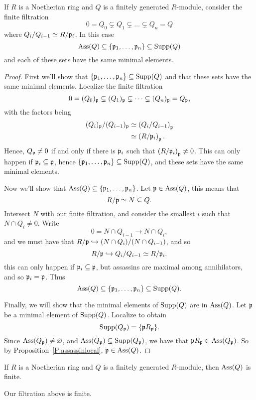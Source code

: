 \documentclass{ximera}
\begin{document}
\begin{theorem}
  If $R$ is a Noetherian ring and $Q$ is a finitely generated
  $R$-module, consider the finite filtration
  \[
  0 = Q_0 \subsetneq Q_1 \subsetneq \dots \subsetneq Q_n = Q 
  \]
  where $Q_i/Q_{i-1} \simeq R/\mathfrak{p}_i$. In this case
  \[
  \operatorname{Ass}(Q) \subseteq \{\mathfrak{p}_1,\dots,\mathfrak{p}_n\}\subseteq \operatorname{Supp}(Q)
  \]
  and each of these sets have the same minimal elements.
  \begin{proof}
    First we'll show that $\{\mathfrak{p}_1,\dots,\mathfrak{p}_n\}\subseteq \operatorname{Supp}(Q)$ and
    that these sets have the same minimal elements. Localize the
    finite filtration
    \[
    0 = (Q_0)_{\mathfrak{p}} \subsetneq (Q_1)_{\mathfrak{p}} \subsetneq \dots \subsetneq (Q_n)_{\mathfrak{p}} = Q_{\mathfrak{p}},
    \]
    with the factors being
    \begin{align*}
      (Q_i)_{\mathfrak{p}}/(Q_{i-1})_{\mathfrak{p}} &\simeq \left(Q_i/Q_{i-1}\right)_{\mathfrak{p}}\\
      &\simeq \left(R/\mathfrak{p}_i\right)_{\mathfrak{p}}.
    \end{align*}
    Hence, $Q_{\mathfrak{p}} \ne 0$ if and only if there is $\mathfrak{p}_i$ such that
    $\left(R/\mathfrak{p}_i\right)_{\mathfrak{p}} \ne 0$. This can only happen if
    $\mathfrak{p}_i\subseteq\mathfrak{p}$, hence $\{\mathfrak{p}_1,\dots,\mathfrak{p}_n\}\subseteq \operatorname{Supp}(Q)$, and
    these sets have the same minimal elements.

    Now we'll show that $\operatorname{Ass}(Q)\subseteq\{\mathfrak{p}_1,\dots,\mathfrak{p}_n\}$. Let
    $\mathfrak{p}\in\operatorname{Ass}(Q)$, this means that
    \[
    R/\mathfrak{p} \simeq N \subseteq Q.
    \]
    Intersect $N$ with our finite filtration, and consider the
    smallest $i$ such that $N\cap Q_i\ne 0$. Write
    \[
    0=N\cap Q_{i-1}\to N\cap Q_i,
    \]
    and we must have that $R/\mathfrak{p} \hookrightarrow (N\cap Q_i)/(N\cap Q_{i-1})$, and so
    \[
    R/\mathfrak{p} \hookrightarrow Q_i/Q_{i-1} \simeq R/\mathfrak{p}_i.
    \]
    this can only happen if $\mathfrak{p}_i\subseteq \mathfrak{p}$, but assassins are
    maximal among annihilators, and so $\mathfrak{p}_i=\mathfrak{p}$. Thus
    \[
    \operatorname{Ass}(Q)\subseteq\{\mathfrak{p}_1,\dots,\mathfrak{p}_n\}\subseteq \operatorname{Supp}(Q).
    \]

    Finally, we will show that the minimal elements of $\operatorname{Supp}(Q)$ are
    in $\operatorname{Ass}(Q)$. Let $\mathfrak{p}$ be a minimal element of
    $\operatorname{Supp}(Q)$. Localize to obtain
    \[
    \operatorname{Supp}(Q_{\mathfrak{p}}) =\{\mathfrak{p} R_{\mathfrak{p}}\}.
    \]
    Since $\operatorname{Ass}(Q_{\mathfrak{p}})\ne \varnothing$, and
    $\operatorname{Ass}(Q_{\mathfrak{p}})\subseteq\operatorname{Supp}(Q_{\mathfrak{p}})$, we have that $\mathfrak{p}
    R_{\mathfrak{p}}\in\operatorname{Ass}(Q_{\mathfrak{p}})$. So by Proposition~\ref{P:assassinlocal},
    $\mathfrak{p}\in\operatorname{Ass}(Q)$.
  \end{proof}
\end{theorem}


\begin{corollary}
  If $R$ is a Noetherian ring and $Q$ is a finitely generated
  $R$-module, then $\operatorname{Ass}(Q)$ is finite.
  \begin{sketch}
    Our filtration above is finite.
  \end{sketch}
\end{corollary}
\end{document}
